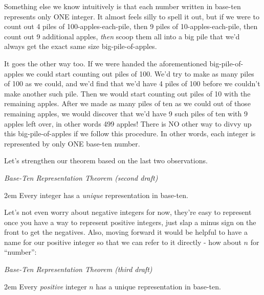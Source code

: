 \documentclass{article}
\newenvironment{jprIn}{\begin{adjustwidth}{2em}{}}{\end{adjustwidth}}
\begin{document}
\bigskip
Something else we know intuitively is that each number written
in base-ten represents only ONE integer.
It almost feels silly to spell it out, but if we were to count out
4 piles of 100-apples-each-pile, then 9 piles of 10-apples-each-pile,
then count out 9 additional apples, \emph{then}
scoop them all into a big pile that
we'd always get the exact same size big-pile-of-apples.

It goes the other way too. If we were handed the aforementioned
big-pile-of-apples we could start counting out
piles of 100. We'd try to make as many piles of 100 as we could,
and we'd find that we'd have 4 piles of 100 before
we couldn't make another such pile.
Then we would start counting out piles of 10 with the remaining apples.
After we made as many piles of ten as we could out of those remaining apples,
we would discover that we'd have 9 such piles of ten
with 9 apples left over, in other words 499 apples! There is NO other
way to divvy up this big-pile-of-apples
if we follow this procedure.  In other words, each integer is
represented by only ONE base-ten number.

Let's strengthen our theorem based on the last two observations.

\emph{Base-Ten Representation Theorem (second draft)}
\begin{jprIn}
Every integer has a \emph{unique} representation in base-ten.
\end{jprIn}

\bigskip
Let's not even worry about negative integers for now,
they're easy to represent once you have a way to represent
positive integers, just slap a minus sign on the front to get the negatives.
Also, moving forward it would be helpful to have a name for our 
positive integer so that we can refer to it directly - how about $n$ for ``number'':

\emph{Base-Ten Representation Theorem (third draft)}
\begin{jprIn}
Every \emph{positive} integer $n$ has a unique representation in base-ten.
\end{jprIn}
\end{document}
